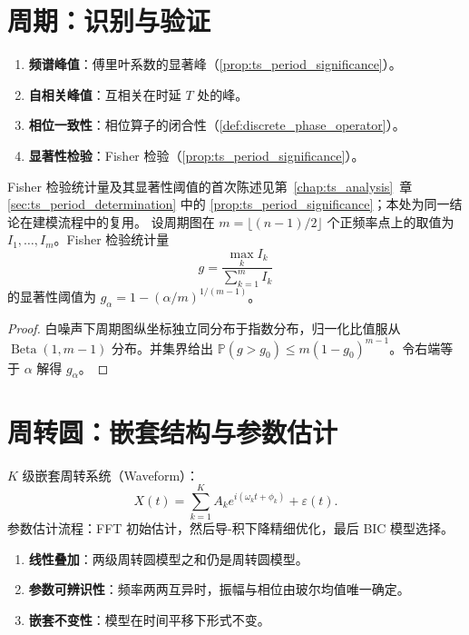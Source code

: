 \section{周期：识别与验证}

\begin{definition}[周期识别的判据]\label{def:period_identification}
\begin{enumerate}[label=(\roman*)]
    \item \textbf{频谱峰值}：傅里叶系数的显著峰（\cref{prop:ts_period_significance}）。
    \item \textbf{自相关峰值}：互相关在时延 $T$ 处的峰。
    \item \textbf{相位一致性}：相位算子的闭合性（\cref{def:discrete_phase_operator}）。
    \item \textbf{显著性检验}：Fisher 检验（\cref{prop:ts_period_significance}）。
\end{enumerate}
\end{definition}

\begin{proposition}\label{prop:fisher_threshold}
Fisher 检验统计量及其显著性阈值的首次陈述见第~\ref{chap:ts_analysis}~章 \cref{sec:ts_period_determination} 中的 \cref{prop:ts_period_significance}；本处为同一结论在建模流程中的复用。
设周期图在 $m = \lfloor (n-1)/2 \rfloor$ 个正频率点上的取值为 $I_1, \dots, I_m$。Fisher 检验统计量
\[
g = \frac{\max_k I_k}{\sum_{k=1}^{m} I_k}
\]
的显著性阈值为 $g_\alpha = 1 - (\alpha/m)^{1/(m-1)}$。
\end{proposition}

\begin{proof}
白噪声下周期图纵坐标独立同分布于指数分布，归一化比值服从 $\operatorname{Beta}(1, m-1)$ 分布。并集界给出 $\mathbb{P}(g > g_0) \le m(1-g_0)^{m-1}$。令右端等于 $\alpha$ 解得 $g_\alpha$。
\end{proof}

\section{周转圆：嵌套结构与参数估计}

\begin{definition}[周转圆建模]\label{def:epicycle_modelling}
$K$ 级嵌套周转系统（Waveform）：
\[
X(t) = \sum_{k=1}^{K} A_k e^{i(\omega_k t + \phi_k)} + \varepsilon(t).
\]
参数估计流程：FFT 初始估计，然后导-积下降精细优化，最后 BIC 模型选择。
\end{definition}

\begin{property}[周转圆模型的基本性质]\label{ch34_epicycle_properties}
\begin{enumerate}[label=(\roman*)]
    \item \textbf{线性叠加}：两级周转圆模型之和仍是周转圆模型。
    \item \textbf{参数可辨识性}：频率两两互异时，振幅与相位由玻尔均值唯一确定。
    \item \textbf{嵌套不变性}：模型在时间平移下形式不变。
\end{enumerate}
\end{property}

